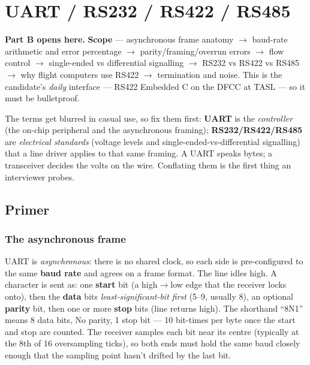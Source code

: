 
\chapter{UART / RS232 / RS422 / RS485}
\label{ch:uart-serial}

\begin{partnote}
\textbf{Part B opens here.} \textbf{Scope} --- asynchronous frame anatomy
$\rightarrow$ baud-rate arithmetic and error percentage $\rightarrow$
parity/framing/overrun errors $\rightarrow$ flow control $\rightarrow$
single-ended vs differential signalling $\rightarrow$ RS232 vs RS422 vs RS485
$\rightarrow$ why flight computers use RS422 $\rightarrow$ termination and
noise. This is the candidate's \emph{daily} interface --- RS422 Embedded C on
the DFCC at TASL --- so it must be bulletproof.
\end{partnote}

The terms get blurred in casual use, so fix them first: \textbf{UART} is the
\emph{controller} (the on-chip peripheral and the asynchronous framing);
\textbf{RS232/RS422/RS485} are \emph{electrical standards} (voltage levels and
single-ended-vs-differential signalling) that a line driver applies to that
same framing. A UART speaks bytes; a transceiver decides the volts on the wire.
Conflating them is the first thing an interviewer probes.

\section{Primer}

\subsection{The asynchronous frame}

UART is \emph{asynchronous}: there is no shared clock, so each side is
pre-configured to the same \textbf{baud rate} and agrees on a frame format.
The line idles high. A character is sent as: one \textbf{start} bit (a
high$\rightarrow$low edge that the receiver locks onto), then the
\textbf{data} bits \emph{least-significant-bit first} (5--9, usually 8), an
optional \textbf{parity} bit, then one or more \textbf{stop} bits (line
returns high). The shorthand ``8N1'' means 8 data bits, No parity, 1 stop bit
--- 10 bit-times per byte once the start and stop are counted. The receiver
samples each bit near its centre (typically at the 8th of 16 oversampling
ticks), so both ends must hold the same baud closely enough that the sampling
point hasn't drifted by the last bit.

